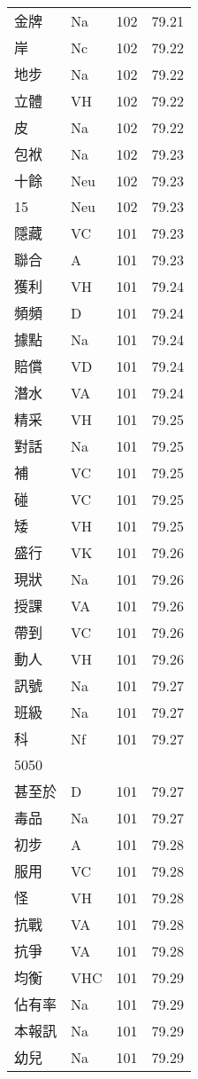 \documentclass[twocolumn]{book}
\begin{document}
\begin{supertabular}{llrr}
金牌 & Na & 102 &  79.21\\
岸 & Nc & 102 &  79.22\\
地步 & Na & 102 &  79.22\\
立體 & VH & 102 &  79.22\\
皮 & Na & 102 &  79.22\\
包袱 & Na & 102 &  79.23\\
十餘 & Neu & 102 &  79.23\\
15 & Neu & 102 &  79.23\\
隱藏 & VC & 101 &  79.23\\
聯合 & A & 101 &  79.23\\
獲利 & VH & 101 &  79.24\\
頻頻 & D & 101 &  79.24\\
據點 & Na & 101 &  79.24\\
賠償 & VD & 101 &  79.24\\
潛水 & VA & 101 &  79.24\\
精采 & VH & 101 &  79.25\\
對話 & Na & 101 &  79.25\\
補 & VC & 101 &  79.25\\
碰 & VC & 101 &  79.25\\
矮 & VH & 101 &  79.25\\
盛行 & VK & 101 &  79.26\\
現狀 & Na & 101 &  79.26\\
授課 & VA & 101 &  79.26\\
帶到 & VC & 101 &  79.26\\
動人 & VH & 101 &  79.26\\
訊號 & Na & 101 &  79.27\\
班級 & Na & 101 &  79.27\\
科 & Nf & 101 &  79.27\\
5050\\
甚至於 & D & 101 &  79.27\\
毒品 & Na & 101 &  79.27\\
初步 & A & 101 &  79.28\\
服用 & VC & 101 &  79.28\\
怪 & VH & 101 &  79.28\\
抗戰 & VA & 101 &  79.28\\
抗爭 & VA & 101 &  79.28\\
均衡 & VHC & 101 &  79.29\\
佔有率 & Na & 101 &  79.29\\
本報訊 & Na & 101 &  79.29\\
幼兒 & Na & 101 &  79.29\\

\end{supertabular}
\end{document}
